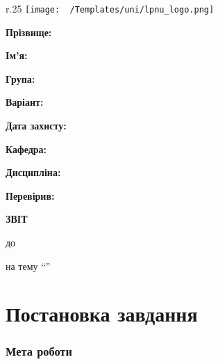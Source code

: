 \Margins
\begin{wrapfigure}[3]{r}{.25\textwidth}
\texttt{[image: ~/Templates/uni/lpnu\_logo.png]} %
\end{wrapfigure}

\noindent\textbf{Прізвище:} \Lname

\noindent\textbf{Ім'я:} \Fname

\noindent\textbf{Група:} \Group

\noindent\textbf{Варіант:} \Variant

\noindent\textbf{Дата захисту:} \Date

\noindent\textbf{Кафедра:} \Department

\noindent\textbf{Дисципліна:} \Discipline

\noindent\textbf{Перевірив:} \Reviser


\begin{center}
	\textbf{ЗВІТ}

	до \Work

	на тему ``\Topic''
\end{center}
\section*{Постановка завдання}
\subsubsection*{Мета роботи}
